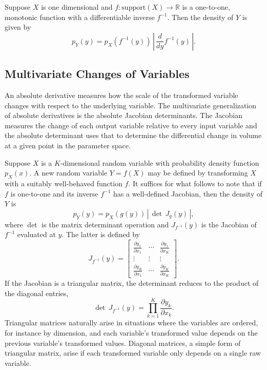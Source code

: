 \documentclass[10pt]{report}
\begin{document}
Suppose $X$ is one dimensional and $f: \mbox{support}(X) \rightarrow
\mathbb{R}$ is a one-to-one, monotonic function with a differentiable
inverse $f^{-1}$.  Then the density of $Y$ is given by
%
\[
p_Y(y) = p_X(f^{-1}(y))  
         \,
         \left| \, \frac{d}{dy} f^{-1}(y)\, \right|.
\]


\subsection{Multivariate Changes of Variables}

An absolute derivative measures how the scale of the transformed
variable changes with respect to the underlying variable.  The
multivariate generalization of absolute derivatives is the absolute
Jacobian determinants.  The Jacobian measures the change of each
output variable relative to every input variable and the absolute
determinant uses that to determine the differential change in volume
at a given point in the parameter space.

Suppose $X$ is a $K$-dimensional random variable with probability
density function $p_X(x)$.  A new random variable $Y = f(X)$ may be
defined by transforming $X$ with a suitably well-behaved function $f$.
It suffices for what follows to note that if $f$ is one-to-one
and its inverse $f^{-1}$ has a well-defined Jacobian, then the
density of $Y$ is
%
\[
p_Y(y) = p_X(g(y)) \, \left| \, \det \, J_g(y) \, \right|,
\]
%
where $\det{}$ is the matrix determinant operation and $J_{f^{-1}}(y)$ is
the Jacobian of $f^{-1}$ evaluated at $y$.  The latter is defined by
\[
J_{f^{-1}}(y) = 
\left[
\begin{array}{ccc}\displaystyle
\frac{\partial y_1}{\partial x_1}
& \cdots
& \displaystyle \frac{\partial y_1}{\partial x_{K}}
\\[6pt]
\vdots & \vdots & \vdots
\\
\displaystyle\frac{\partial y_{K}}{\partial x_1}
& \cdots
& \displaystyle\frac{\partial y_{K}}{\partial x_{K}}
\end{array}
\right].
\]
%
If the Jacobian is a triangular matrix, the determinant reduces to the
product of the diagonal entries,
%
\[
\det \, J_{f^{-1}}(y)
= \prod_{k=1}^K \frac{\partial y_k}{\partial x_k}.
\]
%
Triangular matrices naturally arise in situations where the variables
are ordered, for instance by dimension, and each variable's
transformed value depends on the previous variable's transformed
values.  Diagonal matrices, a simple form of triangular matrix,
arise if each transformed variable only depends on a single raw
variable.
\end{document}

